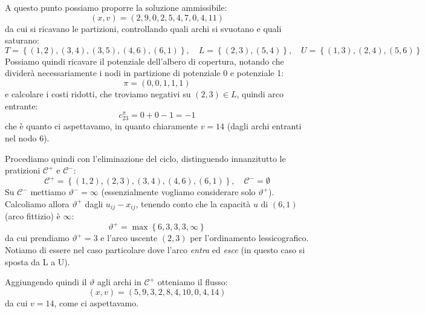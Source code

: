 \documentclass[a4paper,11pt]{article}
\begin{document}
A questo punto possiamo proporre la soluzione ammissibile:
$$
(x,v) = \left( 2, 9, 0, 2, 5, 4, 7, 0, 4, 11 \right)
$$
da cui si ricavano le partizioni, controllando quali archi si svuotano e quali saturano:
$$
T = \left\{ (1,2), (3,4), (3,5), (4,6), (6,1) \right\}, \quad L = \left\{ (2,3), (5,4) \right\}, \quad U = \left\{ (1,3), (2,4), (5,6) \right\}
$$
Possiamo quindi ricavare il potenziale dell'albero di copertura, notando che dividerà necessariamente i nodi in partizione di potenziale 0 e potenziale 1:
$$
\pi = \left( 0, 0, 1, 1 ,1 \right)
$$
e calcolare i costi ridotti, che troviamo negativi su $(2,3) \in L$, quindi arco entrante:
$$
c^\pi_{23} = 0 + 0 - 1 = -1
$$
che è quanto ci aspettavamo, in quanto chiaramente $v = 14$ (dagli archi entranti nel nodo 6).

Procediamo quindi con l'eliminazione del ciclo, distinguendo innanzitutto le pratizioni $\mathcal{C}^+$ e $\mathcal{C}^-$:
$$
\mathcal{C}^+ = \left\{ (1,2), (2,3), (3,4), (4,6), (6, 1) \right\}, \quad \mathcal{C}^- = \emptyset
$$
Su $\mathcal{C}^-$ mettiamo $\vartheta^- = \infty$ (essenzialmente vogliamo considerare solo $\vartheta^+$).
Calcoliamo allora $\vartheta^+$ dagli $u_{ij} - x_{ij}$, tenendo conto che la capacità $u$ di $(6,1)$ (arco fittizio) è $\infty$:
$$
\vartheta^+ = \max \left\{ 6, 3, 3, 3, \infty \right\}
$$
da cui prendiamo $\vartheta^+ = 3$ e l'arco uscente $(2,3)$ per l'ordinamento lessicografico.
Notiamo di essere nel caso particolare dove l'arco \textit{entra} ed \textit{esce} (in questo caso si sposta da L a U).

Aggiungendo quindi il $\vartheta$ agli archi in $\mathcal{C}^+$ otteniamo il flusso:
$$
(x, v) = \left( 5, 9, 3, 2, 8, 4, 10, 0, 4, 14 \right)
$$
da cui $v=14$, come ci aspettavamo.
\end{document}
